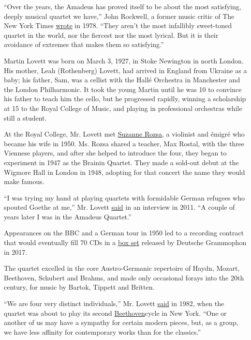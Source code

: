 ``Over the years, the Amadeus has proved itself to be about the most
satisfying, deeply musical quartet we have,'' John Rockwell, a former
music critic of The New York Times \href{https://nyti.ms/2Ww3P4I}{wrote}
in 1978. ``They aren't the most infallibly sweet-toned quartet in the
world, nor the fiercest nor the most lyrical. But it is their avoidance
of extremes that makes them so satisfying.''

Martin Lovett was born on March 3, 1927, in Stoke Newington in north
London. His mother, Leah (Rothenberg) Lovett, had arrived in England
from Ukraine as a baby; his father, Sam, was a cellist with the Hallé
Orchestra in Manchester and the London Philharmonic. It took the young
Martin until he was 10 to convince his father to teach him the cello,
but he progressed rapidly, winning a scholarship at 15 to the Royal
College of Music, and playing in professional orchestras while still a
student.

At the Royal College, Mr. Lovett met
\href{https://www.thetimes.co.uk/article/suzanne-rozsa-6nctx7ks0h3}{Suzanne
Rozsa}, a violinist and émigré who became his wife in 1950. Ms. Rozsa
shared a teacher, Max Rostal, with the three Viennese players, and after
she helped to introduce the four, they began to experiment in 1947 as
the Brainin Quartet. They made a sold-out debut at the Wigmore Hall in
London in 1948, adopting for that concert the name they would make
famous.

``I was trying my hand at playing quartets with formidable German
refugees who spouted Goethe at me,'' Mr. Lovett
\href{https://www.thejc.com/culture/music/interview-martin-lovett-1.23768}{said}
in an interview in 2011. ``A couple of years later I was in the Amadeus
Quartet.''

Appearances on the BBC and a German tour in 1950 led to a recording
contract that would eventually fill 70 CDs in a
\href{https://www.deutschegrammophon.com/en/catalogue/products/amadeus-quartet-complete-rec-7930}{box
set} released by Deutsche Grammophon in 2017.

The quartet excelled in the core Austro-Germanic repertoire of Haydn,
Mozart, Beethoven, Schubert and Brahms, and made only occasional forays
into the 20th century, for music by Bartok, Tippett and Britten.

``We are four very distinct individuals,'' Mr. Lovett
\href{https://www.nytimes3xbfgragh.onion/1982/03/05/arts/amadeus-quartet-at-35-plays-beethoven-cycle.html}{said}
in 1982, when the quartet was about to play its second
\href{https://www.youtube.com/watch?v=WKY43du5xSo\&feature=youtu.be}{Beethoven}cycle
in New York. ``One or another of us may have a sympathy for certain
modern pieces, but, as a group, we have less affinity for contemporary
works than for the classics.''

